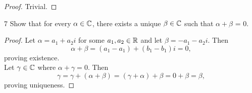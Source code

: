 \documentclass[12pt, letterpaper]{article}
\begin{document}
\begin{proof}
Trivial.
\end{proof}

\begin{problem}{7}
Show that for every $\alpha\in\mathbb{C}$, there exists a unique $\beta\in\mathbb{C}$ such that $\alpha+\beta$ = 0.
\end{problem}

\begin{proof}
Let $\alpha=a_1+a_2i$ for some $a_1,a_2\in\mathbb{R}$ and let $\beta = -a_1-a_2i$. Then
$$\alpha+\beta=(a_1-a_1)+(b_1-b_1)i=0,$$
proving existence. 
\\Let $\gamma\in\mathbb{C}$ where $\alpha+\gamma=0$. Then
$$\gamma = \gamma + (\alpha + \beta) = (\gamma + \alpha) +\beta = 0 + \beta = \beta,$$
proving uniqueness.
\end{proof}
\end{document}

